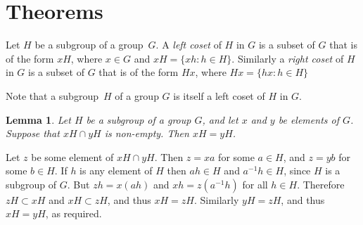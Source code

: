 \newtheorem{theorem}{Theorem}[section]
\newtheorem{lemma}[theorem]{Lemma}
\newtheorem{proposition}[theorem]{Proposition}
\newtheorem{corollary}[theorem]{Corollary}

\newenvironment{proof}[1][Proof]{\begin{trivlist}
\item[\hskip \labelsep {\bfseries #1}]}{\end{trivlist}}
\newenvironment{definition}[1][Definition]{\begin{trivlist}
\item[\hskip \labelsep {\bfseries #1}]}{\end{trivlist}}
\newenvironment{example}[1][Example]{\begin{trivlist}
\item[\hskip \labelsep {\bfseries #1}]}{\end{trivlist}}
\newenvironment{remark}[1][Remark]{\begin{trivlist}
\item[\hskip \labelsep {\bfseries #1}]}{\end{trivlist}}

\newcommand{\qed}{\nobreak \ifvmode \relax \else
      \ifdim\lastskip<1.5em \hskip-\lastskip
      \hskip1.5em plus0em minus0.5em \fi \nobreak
      \vrule height0.75em width0.5em depth0.25em\fi}

\section{Theorems}
\begin{definition}
Let $H$ be a subgroup of a group~$G$.  A \emph{left coset}
of $H$ in $G$ is a subset of $G$ that is of the form $xH$,
where $x \in G$ and $xH = \{ xh : h \in H \}$.
Similarly a \emph{right coset} of $H$ in $G$ is a subset
of $G$ that is of the form $Hx$, where
$Hx = \{ hx : h \in H \}$
\end{definition}

Note that a subgroup~$H$ of a group $G$ is itself a
left coset of $H$ in $G$.

\begin{lemma}
\label{LeftCosetsDisjoint}
Let $H$ be a subgroup of a group $G$, and let $x$ and $y$ be
elements of $G$.  Suppose that $xH \cap yH$ is non-empty.
Then $xH = yH$.
\end{lemma}

\begin{proof}
Let $z$ be some element of $xH \cap yH$.  Then $z = xa$
for some $a \in H$, and $z = yb$ for some $b \in H$.
If $h$ is any element of $H$ then $ah \in H$ and
$a^{-1}h \in H$, since $H$ is a subgroup of $G$.
But $zh = x(ah)$ and $xh = z(a^{-1}h)$ for all $h \in H$.
Therefore $zH \subset xH$ and $xH \subset zH$, and thus
$xH = zH$.  Similarly $yH = zH$, and thus $xH = yH$,
as required.\qed
\end{proof}

